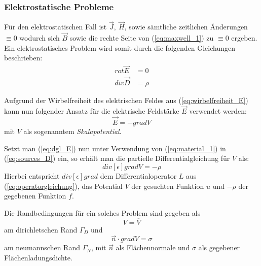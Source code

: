 \subsubsection{Elektrostatische Probleme}
\label{sec:electrostatic_problems}
Für den elektrostatischen Fall ist $\vec{J},\ \vec{H}$, sowie sämtliche zeitlichen Änderungen $\equiv 0$ wodurch sich $\vec{B}$ sowie die rechte Seite von (\ref{eq:maxwell_1}) zu $\equiv 0$ ergeben.\newline
Ein elektrostatisches Problem wird somit durch die folgenden Gleichungen beschrieben:
\begin{align}
\mathit{rot}\vec{E} &= 0 \label{eq:wirbelfreiheit_E}\\
\mathit{div}\vec{D} &= \rho \label{eq:sources_D}
\end{align}\newline

Aufgrund der Wirbelfreiheit des elektrischen Feldes aus (\ref{eq:wirbelfreiheit_E}) kann nun folgender Ansatz für die elektrische Feldstärke $\vec{E}$ verwendet werden:
\begin{equation}
\label{eq:dgl_E}
\vec{E} = -\mathit{grad}V
\end{equation}
mit $V$ als sogenanntem \textit{Skalapotential}.\newline

Setzt man (\ref{eq:dgl_E}) nun unter Verwendung von (\ref{eq:material_1}) in (\ref{eq:sources_D}) ein, so erhält man die partielle Differentialgleichung für $V$ als:
\begin{equation}
\mathit{div}[\epsilon]\mathit{grad}V = -\rho
\end{equation}
Hierbei entspricht $\mathit{div}[\epsilon]\mathit{grad}$ dem Differentialoperator $L$ aus (\ref{eq:operatorgleichung}), das Potential $V$ der gesuchten Funktion $u$ und $-\rho$ der gegebenen Funktion $f$.\newline

Die Randbedingungen für ein solches Problem sind gegeben als
\begin{equation}
\label{eq:e-static_dirichlet_condition}
	V = \overline{V}
\end{equation}
am dirichletschen Rand $\Gamma_D$ und 
\begin{equation}
\label{eq:e-static_neumann_condition}
\vec{n}\cdot\mathit{grad}V = \sigma 
\end{equation}
am neumannschen Rand $\Gamma_N$, mit $\vec{n}$ als Flächennormale und $\sigma$ als gegebener Flächenladungsdichte.\newline

